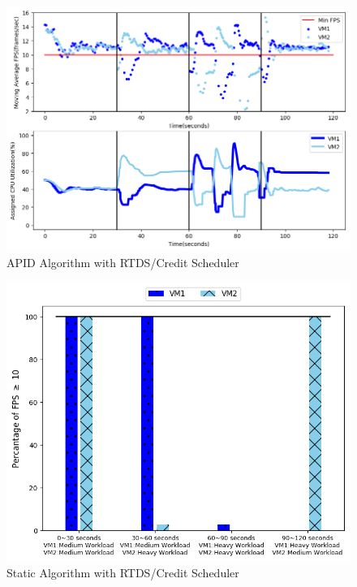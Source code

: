 \begin{itemize}
\begin{figure}[h!]
\centering
\includegraphics[width=1\linewidth]{images/2vm_apid}
\caption{APID Algorithm with RTDS/Credit Scheduler}
\label{2vm_apid}
\end{figure}



\begin{figure}[h!]
\centering
\includegraphics[width=1\linewidth]{images/2vm_fps_static}
\caption{Static Algorithm with RTDS/Credit Scheduler}
\label{2vm_fps_static}
\end{figure}


\end{itemize}
